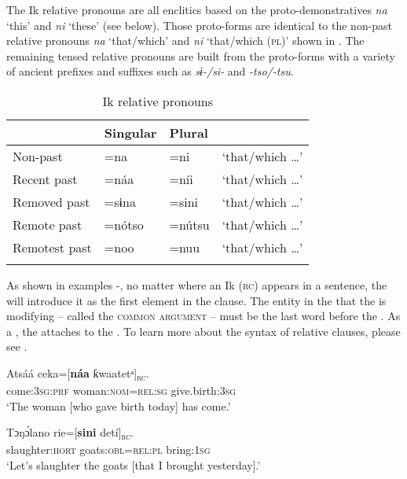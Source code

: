 The Ik relative pronouns are all enclitics based on the proto-demonstratives \textit{na} ‘this’ and \textit{ni} ‘these’ (see  below). Those proto-forms are identical to the non-past relative pronouns \textit{na} ‘that/which’ and \textit{ni} ‘that/which (\textsc{pl})’ shown in . The remaining tensed relative pronouns are built from the proto-forms with a variety of ancient prefixes and suffixes such as \textit{sɨ-/si-} and \textit{-tso/-tsu}.


\begin{table}
\caption{Ik relative pronouns}
\label{tab:pro:rel}


\begin{tabularx}{\textwidth}{XXXX}
\lsptoprule

& Singular & Plural & \\
\midrule
Non-past & =na & =ni & ‘that/which {\dots}’\\
Recent past & =náa & =níi & ‘that/which {\dots}’\\
Removed past & =sɨna & =sini & ‘that/which {\dots}’\\
Remote past & =nótso & =nútsu & ‘that/which {\dots}’\\
Remotest past & =noo & =nuu & ‘that/which {\dots}’\\
\lspbottomrule
\end{tabularx}
\end{table}
As shown in examples -, no matter where an Ik  (\textsc{rc}) appears in a sentence, the  will introduce it as the first element in the clause. The entity in the  that the  is modifying – called the \textsc{common argument} – must be the last word before the . As a , the  attaches to the . To learn more about the syntax of relative clauses, please see .




\ea\label{ex:pro:3}
\gll Atsáá     ceka=[\textbf{náa}       ƙwaatetᵃ]\textsc{\textsubscript{rc}}. \\
come:\textsc{3sg:prf}   woman:\textsc{nom}=\textsc{rel:sg} give.birth:\textsc{3sg}    \\
\glt ‘The woman [who gave birth today] has come.’ 
\z




\ea\label{ex:pro:4}
\gll Tɔŋ\'{ɔ}lano     rie=[\textbf{sini}     detí]\textsc{\textsubscript{rc}}. \\
slaughter:\textsc{hort}   goats:\textsc{obl}=\textsc{rel:pl}   bring:\textsc{1sg}    \\
\glt ‘Let’s slaughter the goats [that I brought yesterday].’ 
\z






